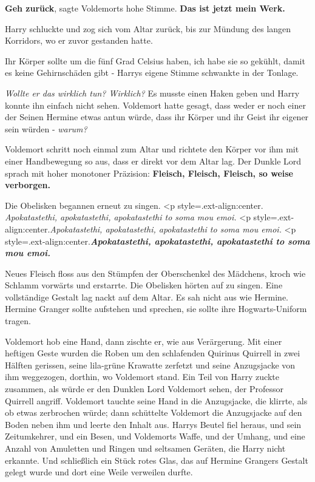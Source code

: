 \glqq{}\textbf{Geh zurück}\grqq{}, sagte Voldemorts hohe Stimme. \glqq{}
\textbf{Das ist jetzt mein Werk.}\grqq{}

Harry schluckte und zog sich vom Altar zurück, bis zur Mündung des langen
Korridors, wo er zuvor gestanden hatte.

\glqq{}Ihr Körper sollte um die fünf Grad Celsius haben, ich habe sie so gekühlt,
damit es keine Gehirnschäden gibt -\grqq{} Harrys eigene Stimme schwankte in der
Tonlage.

\emph{Wollte er das wirklich tun? Wirklich?}
Es musste einen Haken geben und Harry konnte ihn einfach nicht sehen. Voldemort
hatte gesagt, dass weder er noch einer der Seinen Hermine etwas antun würde,
dass ihr Körper und ihr Geist ihr eigener sein würden - \emph{warum?}

Voldemort schritt noch einmal zum Altar und richtete den Körper vor ihm mit
einer Handbewegung so aus, dass er direkt vor dem Altar lag. Der Dunkle Lord
sprach mit hoher monotoner Präzision: \glqq{}\textbf{Fleisch, Fleisch, Fleisch,
so weise verborgen.}\grqq{}

Die Obelisken begannen erneut zu singen. <p
style=\grqq{}.ext-align:center\grqq{}. \emph{Apokatastethi, apokatastethi,
apokatastethi to soma mou emoi.}   <p
style=\grqq{}.ext-align:center\grqq{}.\emph{Apokatastethi, apokatastethi,
apokatastethi to soma mou emoi.}   <p
style=\grqq{}.ext-align:center\grqq{}.\textbf{\emph{Apokatastethi,
apokatastethi, apokatastethi to soma mou emoi.} }

Neues Fleisch floss aus den Stümpfen der Oberschenkel des Mädchens, kroch wie
Schlamm vorwärts und erstarrte. Die Obelisken hörten auf zu singen. Eine
vollständige Gestalt lag nackt auf dem Altar. Es sah nicht aus wie Hermine.
Hermine Granger sollte aufstehen und sprechen, sie sollte ihre Hogwarts-Uniform
tragen.

Voldemort hob eine Hand, dann zischte er, wie aus Verärgerung. Mit einer
heftigen Geste wurden die Roben um den schlafenden Quirinus Quirrell in zwei
Hälften gerissen, seine lila-grüne Krawatte zerfetzt und seine Anzugsjacke von
ihm weggezogen, dorthin, wo Voldemort stand. Ein Teil von Harry zuckte zusammen,
als würde er den Dunklen Lord Voldemort sehen, der Professor Quirrell angriff.
Voldemort tauchte seine Hand in die Anzugsjacke, die klirrte, als ob etwas
zerbrochen würde; dann schüttelte Voldemort die Anzugsjacke auf den Boden neben
ihm und leerte den Inhalt aus. Harrys Beutel fiel heraus, und sein Zeitumkehrer,
und ein Besen, und Voldemorts Waffe, und der Umhang, und eine Anzahl von
Amuletten und Ringen und seltsamen Geräten, die Harry nicht erkannte. Und
schließlich ein Stück rotes Glas, das auf Hermine Grangers Gestalt gelegt wurde
und dort eine Weile verweilen durfte.

